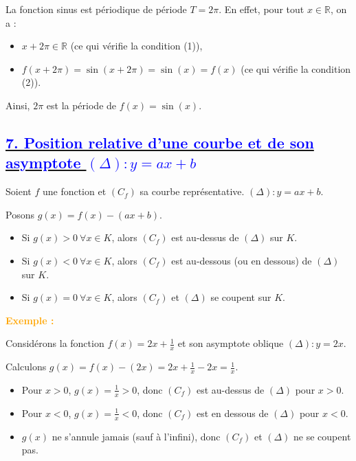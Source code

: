 \documentclass{article}
\newcounter{exemple}
\newcommand{\exemple}{%
  \refstepcounter{exemple}%
  \textbf{\textcolor{orange}{Exemple \theexemple : }} \ignorespaces
}
\begin{document}
La fonction sinus est périodique de période $T = 2\pi$. En effet, pour tout $x \in \mathbb{R}$, on a :

\begin{itemize}
    \item $x + 2\pi \in \mathbb{R}$ (ce qui vérifie la condition (1)),
    \item $f(x + 2\pi) = \sin(x + 2\pi) = \sin(x) = f(x)$ (ce qui vérifie la condition (2)).
\end{itemize}

Ainsi, $2\pi$ est la période de $f(x) = \sin(x)$.

\subsection*{\underline{\textbf{\textcolor{blue}{7. Position relative d’une courbe et de son asymptote \( (\Delta): y = ax + b \)}}}}

Soient $f$ une fonction et $(C_f)$ sa courbe représentative. $(\Delta) : y = ax + b$.

Posons $g(x) = f(x) - (ax + b)$.

\begin{itemize}
    \item Si $g(x) > 0 \ \forall x \in K$, alors $(C_f)$ est au-dessus de $(\Delta)$ sur $K$.
    \item Si $g(x) < 0 \ \forall x \in K$, alors $(C_f)$ est au-dessous (ou en dessous) de $(\Delta)$ sur $K$.
    \item Si $g(x) = 0 \ \forall x \in K$, alors $(C_f)$ et $(\Delta)$ se coupent sur $K$.
\end{itemize}

\textbf{\exemple}

Considérons la fonction \( f(x) = 2x + \frac{1}{x} \) et son asymptote oblique \( (\Delta) : y = 2x \).

Calculons \( g(x) = f(x) - (2x) = 2x + \frac{1}{x} - 2x = \frac{1}{x} \).

\begin{itemize}
    \item Pour \( x > 0 \), \( g(x) = \frac{1}{x} > 0 \), donc \( (C_f) \) est au-dessus de \( (\Delta) \) pour \( x > 0 \).
    \item Pour \( x < 0 \), \( g(x) = \frac{1}{x} < 0 \), donc \( (C_f) \) est en dessous de \( (\Delta) \) pour \( x < 0 \).
    \item \( g(x) \) ne s'annule jamais (sauf à l'infini), donc \( (C_f) \) et \( (\Delta) \) ne se coupent pas.
\end{itemize}
\end{document}
